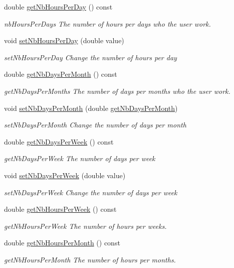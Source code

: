 \begin{DoxyCompactItemize}
double \hyperlink{classModels_1_1User_a5ebdd9899c343c828d03c74045aa6989}{get\-Nb\-Hours\-Per\-Day} () const 
\begin{DoxyCompactList}\small\item\em nb\-Hours\-Per\-Days The number of hours per days who the user work. \end{DoxyCompactList}\item 
void \hyperlink{classModels_1_1User_a1fcef9f88da89f808a5a2225ca11c809}{set\-Nb\-Hours\-Per\-Day} (double value)
\begin{DoxyCompactList}\small\item\em set\-Nb\-Hours\-Per\-Day Change the number of hours per day \end{DoxyCompactList}\item 
double \hyperlink{classModels_1_1User_a264cf13078c59b3f676e038db2dffc2e}{get\-Nb\-Days\-Per\-Month} () const 
\begin{DoxyCompactList}\small\item\em get\-Nb\-Days\-Per\-Months The number of days per months who the user work. \end{DoxyCompactList}\item 
void \hyperlink{classModels_1_1User_ac68ad7cdc7da220cbb03d99dffd6d774}{set\-Nb\-Days\-Per\-Month} (double \hyperlink{classModels_1_1User_a264cf13078c59b3f676e038db2dffc2e}{get\-Nb\-Days\-Per\-Month})
\begin{DoxyCompactList}\small\item\em set\-Nb\-Days\-Per\-Month Change the number of days per month \end{DoxyCompactList}\item 
double \hyperlink{classModels_1_1User_a5e3d5058a495cf15d2741b788bc971c1}{get\-Nb\-Days\-Per\-Week} () const 
\begin{DoxyCompactList}\small\item\em get\-Nb\-Days\-Per\-Week The number of days per week \end{DoxyCompactList}\item 
void \hyperlink{classModels_1_1User_a463e429e22f908f304d66fc22e48fc8e}{set\-Nb\-Days\-Per\-Week} (double value)
\begin{DoxyCompactList}\small\item\em set\-Nb\-Days\-Per\-Week Change the number of days per week \end{DoxyCompactList}\item 
double \hyperlink{classModels_1_1User_a9224cf423418449ecfa85c762cc1ee5a}{get\-Nb\-Hours\-Per\-Week} () const 
\begin{DoxyCompactList}\small\item\em get\-Nb\-Hours\-Per\-Week The number of hours per weeks. \end{DoxyCompactList}\item 
double \hyperlink{classModels_1_1User_acc716536a65768c721242cfa18f207af}{get\-Nb\-Hours\-Per\-Month} () const 
\begin{DoxyCompactList}\small\item\em get\-Nb\-Hours\-Per\-Month The number of hours per months. \end{DoxyCompactList}\end{DoxyCompactItemize}
